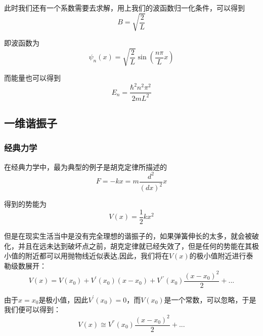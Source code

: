 \documentclass{article}
\begin{document}
此时我们还有一个系数需要去求解，用上我们的波函数归一化条件，可以得到
\[
    B=\sqrt{\frac{2}{L}}
\]

即波函数为
\[
    \psi_n(x)=\sqrt{\frac{2}{L}}\sin\left(\frac{n\pi}{L}x\right)
\]

而能量也可以得到
\[
    E_n=\frac{\hbar^2n^2\pi^2}{2mL^2}
\]


\subsection{一维谐振子}

\subsubsection{经典力学}
在经典力学中，最为典型的例子是胡克定律所描述的
\[F=-kx=m\frac{d^2}{(dx)^2}x\]

得到的势能为
\[V(x)=\frac{1}{2}kx^2\]

但是在现实生活当中是没有完全理想的谐振子的，如果弹簧伸长的太多，就会被破化，并且在远未达到破坏点之前，胡克定律就已经失效了，但是任何的势能在其极小值的附近都可以用抛物线近似表达,因此，我们将在$V(x)$的极小值附近进行泰勒级数展开：
\[
    V(x)=V(x_0)+V^\prime(x_0)(x-x_0)+V^{\prime\prime}(x_0)\frac{(x-x_0)^2}{2}+...
\]

由于$x=x_0$是极小值，因此$V^\prime(x_0)=0$，而$V(x_0)$是一个常数，可以忽略，于是我们便可以得到：
\[
    V(x)\cong V^{''}(x_0)\frac{(x-x_0)^2}{2}+...
\]
\begin{figure}[hbtp]
    \centering
\end{figure}
\end{document}
